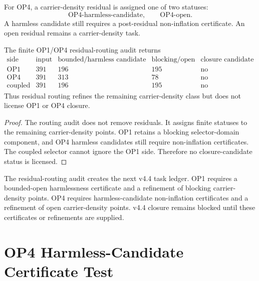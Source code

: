 \begin{definition}
For OP4, a carrier-density residual is assigned one of two statuses:
\[
\mathrm{OP4\text{-}harmless\text{-}candidate},
\qquad
\mathrm{OP4\text{-}open}.
\]
A harmless candidate still requires a post-residual non-inflation certificate.
An open residual remains a carrier-density task.
\end{definition}

\begin{proposition}
The finite OP1/OP4 residual-routing audit returns
\[
\begin{array}{c|r|r|r|c}
\text{side} & \text{input} & \text{bounded/harmless candidate} &
\text{blocking/open} & \text{closure candidate}\\
\hline
\mathrm{OP1} & 391 & 196 & 195 & \mathrm{no}\\
\mathrm{OP4} & 391 & 313 & 78 & \mathrm{no}\\
\mathrm{coupled} & 391 & 196 & 195 & \mathrm{no}
\end{array}
\]
Thus residual routing refines the remaining carrier-density class but does not
license OP1 or OP4 closure.
\end{proposition}

\begin{proof}
The routing audit does not remove residuals.  It assigns finite statuses to the
remaining carrier-density points.  OP1 retains a blocking selector-domain
component, and OP4 harmless candidates still require non-inflation
certificates.  The coupled selector cannot ignore the OP1 side.  Therefore no
closure-candidate status is licensed.
\end{proof}

\begin{theorem}
The residual-routing audit creates the next v4.4 task ledger.  OP1 requires a
bounded-open harmlessness certificate and a refinement of blocking
carrier-density points.  OP4 requires harmless-candidate non-inflation
certificates and a refinement of open carrier-density points.  v4.4 closure
remains blocked until these certificates or refinements are supplied.
\end{theorem}



\section{OP4 Harmless-Candidate Certificate Test}
\label{sec:v44-op4-harmless-candidate-certificate-test}

